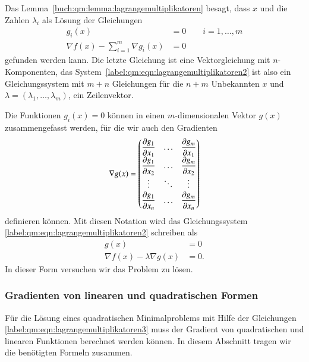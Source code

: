 Das Lemma~\ref{buch:qm:lemma:lagrangemultiplikatoren} besagt, dass
$x$ und die Zahlen $\lambda_i$ als Lösung der Gleichungen
\begin{equation}
\begin{aligned}
g_i(x)&=0\qquad i=1,\dots,m\\
\nabla f(x) -\sum_{i=1}^m \nabla g_i(x)&=0
\end{aligned}
\label{label:qm:eqn:lagrangemultiplikatoren2}
\end{equation}
gefunden werden kann.
Die letzte Gleichung ist eine Vektorgleichung mit $n$-Komponenten,
das System~\eqref{label:qm:eqn:lagrangemultiplikatoren2} ist also
ein Gleichungssystem mit $m+n$ Gleichungen für die $n+m$
Unbekannten $x$ und $\lambda=(\lambda_1,\dots,\lambda_m)$, ein Zeilenvektor.

Die Funktionen $g_i(x)=0$ können in einen $m$-dimensionalen Vektor
$g(x)$ zusammengefasst werden, für die wir auch den Gradienten
\[
\nabla g(x)
=
\renewcommand\arraystretch{1.25}
\begin{pmatrix}
\displaystyle\frac{\partial g_1}{\partial x_1} & \dots
	& \displaystyle\frac{\partial g_m}{\partial x_1}\\
\displaystyle\frac{\partial g_1}{\partial x_2} & \dots
	& \displaystyle\frac{\partial g_m}{\partial x_2}\\
\vdots & \ddots & \vdots \\
\displaystyle\frac{\partial g_1}{\partial x_n} & \dots
	& \displaystyle\frac{\partial g_m}{\partial x_n}
\end{pmatrix}
\]
definieren können.
Mit diesen Notation wird das Gleichungssystem
\eqref{label:qm:eqn:lagrangemultiplikatoren2}
schreiben als
\begin{equation}
\begin{aligned}
g(x)&=0\\
\nabla f(x) - \lambda  \nabla g(x) &= 0.
\end{aligned}
\label{label:qm:eqn:lagrangemultiplikatoren3}
\end{equation}
In dieser Form versuchen wir das Problem zu lösen.

%
%
\subsubsection{Gradienten von linearen und quadratischen Formen}
Für die Lösung eines quadratischen Minimalproblems mit Hilfe der Gleichungen
\eqref{label:qm:eqn:lagrangemultiplikatoren3} muss der Gradient
von quadratischen und linearen Funktionen berechnet werden können.
In diesem Abschnitt tragen wir die benötigten Formeln zusammen.

